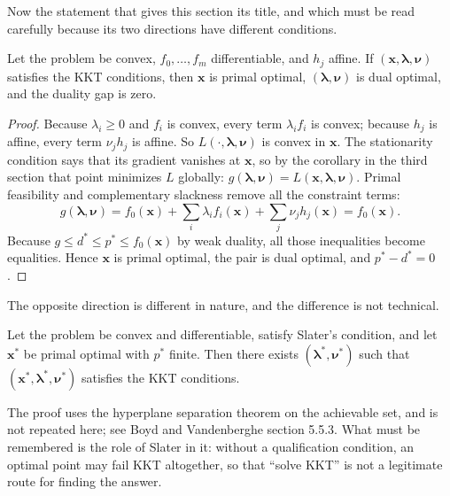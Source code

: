 Now the statement that gives this section its title, and which must be read carefully because
its two directions have different conditions.

\begin{teorema}
Let the problem be convex, $f_{0},\dots,f_{m}$ differentiable, and $h_{j}$ affine. If
$(\mathbf{x},\boldsymbol{\lambda},\boldsymbol{\nu})$ satisfies the KKT conditions, then
$\mathbf{x}$ is primal optimal, $(\boldsymbol{\lambda},\boldsymbol{\nu})$ is dual optimal, and
the duality gap is zero.
\end{teorema}

\begin{proof}
Because $\lambda_{i}\ge0$ and $f_{i}$ is convex, every term $\lambda_{i}f_{i}$ is convex;
because $h_{j}$ is affine, every term $\nu_{j}h_{j}$ is affine. So
$L(\cdot,\boldsymbol{\lambda},\boldsymbol{\nu})$ is convex in $\mathbf{x}$. The stationarity
condition says that its gradient vanishes at $\mathbf{x}$, so by the corollary in the third
section that point minimizes $L$ globally:
$g(\boldsymbol{\lambda},\boldsymbol{\nu})=L(\mathbf{x},\boldsymbol{\lambda},
\boldsymbol{\nu})$. Primal feasibility and complementary slackness remove all the constraint
terms:
\[
  g(\boldsymbol{\lambda},\boldsymbol{\nu})
  =f_{0}(\mathbf{x})+\sum_{i}\lambda_{i}f_{i}(\mathbf{x})
   +\sum_{j}\nu_{j}h_{j}(\mathbf{x})=f_{0}(\mathbf{x}).
\]
Because $g\le d^{*}\le p^{*}\le f_{0}(\mathbf{x})$ by weak duality, all those inequalities
become equalities. Hence $\mathbf{x}$ is primal optimal, the pair is dual optimal, and
$p^{*}-d^{*}=0$.
\end{proof}

The opposite direction is different in nature, and the difference is not technical.

\begin{teorema}
Let the problem be convex and differentiable, satisfy Slater's condition, and let
$\mathbf{x}^{*}$ be primal optimal with $p^{*}$ finite. Then there exists
$(\boldsymbol{\lambda}^{*},\boldsymbol{\nu}^{*})$ such that
$(\mathbf{x}^{*},\boldsymbol{\lambda}^{*},\boldsymbol{\nu}^{*})$ satisfies the KKT conditions.
\end{teorema}

The proof uses the hyperplane separation theorem on the achievable set, and is not repeated
here; see Boyd and Vandenberghe section 5.5.3. What must be remembered is the role of Slater in
it: without a qualification condition, an optimal point may fail KKT altogether, so that
``solve KKT'' is not a legitimate route for finding the answer.

